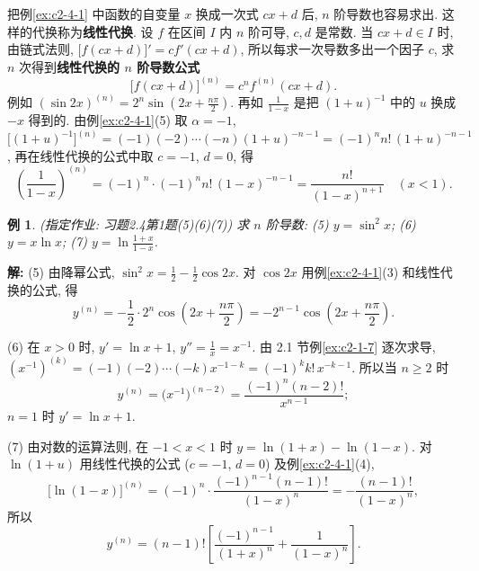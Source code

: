 \documentclass[UTF8,openany]{ctexbook}
\theoremstyle{chinesetextbook}
\newtheorem{example}{例}[section]
\newenvironment{cnsolution}{\par\indent\textbf{解:} \ignorespaces}{\par}
\begin{document}
把例\ref{ex:c2-4-1} 中函数的自变量 $x$ 换成一次式 $cx+d$ 后, $n$ 阶导数也容易求出. 这样的代换称为\textbf{线性代换}. 设 $f$ 在区间 $I$ 内 $n$ 阶可导, $c,d$ 是常数. 当 $cx+d\in I$ 时, 由链式法则, $\bigl[f(cx+d)\bigr]'=cf'(cx+d)$, 所以每求一次导数多出一个因子 $c$, 求 $n$ 次得到\textbf{线性代换的 $n$ 阶导数公式}
\[
\bigl[f(cx+d)\bigr]^{(n)}=c^nf^{(n)}(cx+d).
\]
例如 $\displaystyle(\sin2x)^{(n)}=2^n\sin\left(2x+\frac{n\pi}2\right)$. 再如 $\displaystyle\frac1{1-x}$ 是把 $(1+u)^{-1}$ 中的 $u$ 换成 $-x$ 得到的. 由例\ref{ex:c2-4-1}(5) 取 $\alpha=-1$, $\bigl[(1+u)^{-1}\bigr]^{(n)}=(-1)(-2)\cdots(-n)(1+u)^{-n-1}=(-1)^nn!\,(1+u)^{-n-1}$, 再在线性代换的公式中取 $c=-1$, $d=0$, 得
\[
\left(\frac1{1-x}\right)^{(n)}=(-1)^n\cdot(-1)^nn!\,(1-x)^{-n-1}=\frac{n!}{(1-x)^{n+1}}\quad(x<1).
\]
\begin{example}\label{ex:c2-h4-1}
\textnormal{(指定作业: 习题2.4第1题(5)(6)(7))} 求 $n$ 阶导数: (5) $y=\sin^2x$; (6) $y=x\ln x$; (7) $\displaystyle y=\ln\frac{1+x}{1-x}$.
\end{example}
\begin{cnsolution}
(5) 由降幂公式, $\displaystyle\sin^2x=\frac12-\frac12\cos2x$. 对 $\cos2x$ 用例\ref{ex:c2-4-1}(3) 和线性代换的公式, 得
\[
y^{(n)}=-\frac12\cdot2^n\cos\left(2x+\frac{n\pi}2\right)=-2^{n-1}\cos\left(2x+\frac{n\pi}2\right).
\]

(6) 在 $x>0$ 时, $y'=\ln x+1$, $\displaystyle y''=\frac1x=x^{-1}$. 由 2.1 节例\ref{ex:c2-1-7} 逐次求导, $(x^{-1})^{(k)}=(-1)(-2)\cdots(-k)x^{-1-k}=(-1)^kk!\,x^{-k-1}$. 所以当 $n\ge2$ 时
\[
y^{(n)}=\bigl(x^{-1}\bigr)^{(n-2)}=\frac{(-1)^n(n-2)!}{x^{n-1}};
\]
$n=1$ 时 $y'=\ln x+1$.

(7) 由对数的运算法则, 在 $-1<x<1$ 时 $y=\ln(1+x)-\ln(1-x)$. 对 $\ln(1+u)$ 用线性代换的公式 ($c=-1$, $d=0$) 及例\ref{ex:c2-4-1}(4),
\[
\bigl[\ln(1-x)\bigr]^{(n)}=(-1)^n\cdot\frac{(-1)^{n-1}(n-1)!}{(1-x)^n}=-\frac{(n-1)!}{(1-x)^n},
\]
所以
\[
y^{(n)}=(n-1)!\left[\frac{(-1)^{n-1}}{(1+x)^n}+\frac1{(1-x)^n}\right].
\]
\end{cnsolution}
\end{document}
